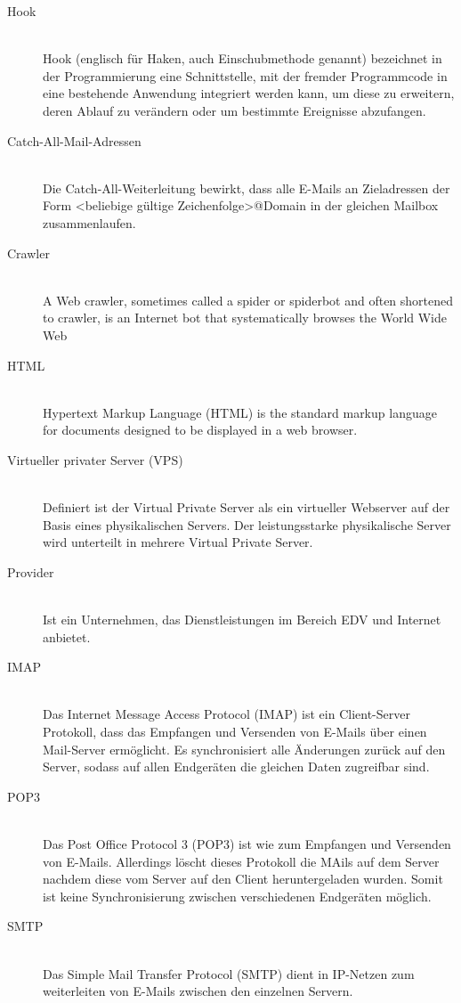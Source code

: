 \documentclass[a4paper,11pt,singlespacing]{article}
\begin{document}
\begin{description}
	\item[Hook\label{itm:Hook}]\hfill \\
		Hook (englisch für Haken, auch Einschubmethode genannt) bezeichnet in der Programmierung eine Schnittstelle, mit der fremder Programmcode in eine bestehende Anwendung integriert werden kann, um diese zu erweitern, deren Ablauf zu verändern oder um bestimmte Ereignisse abzufangen.\cite{Hook}
	\item[Catch-All-Mail-Adressen\label{itm:Catch-All-Mail}]\hfill \\
		Die Catch-All-Weiterleitung bewirkt, dass alle E-Mails an Zieladressen der Form <beliebige gültige Zeichenfolge>@Domain in der gleichen Mailbox zusammenlaufen.\cite{Catch-All-Mail}
	\item[Crawler\label{itm:crawler}]\hfill \\
		A Web crawler, sometimes called a spider or spiderbot and often shortened to crawler, is an Internet bot that systematically browses the World Wide Web \cite{crawler}
	\item[HTML\label{itm:HTML}]\hfill \\
		Hypertext Markup Language (HTML) is the standard markup language for documents designed to be displayed in a web browser.\cite{HTML}
	\item[Virtueller privater Server (VPS)\label{itm:VPS}]\hfill \\
        	Definiert ist der Virtual Private Server als ein virtueller Webserver auf der Basis eines physikalischen Servers.
		Der leistungsstarke physikalische Server wird unterteilt in mehrere Virtual Private Server.\cite{VPS}
	\item[Provider\label{itm:Provider}]\hfill \\
		Ist ein Unternehmen, das Dienstleistungen im Bereich EDV und Internet anbietet. \cite{provider}
	\item[IMAP\label{itm:IMAP}]\hfill \\
		Das Internet Message Access Protocol (IMAP) ist ein Client-Server Protokoll, dass das Empfangen und Versenden von E-Mails über einen Mail-Server ermöglicht. Es synchronisiert alle Änderungen zurück auf den Server, sodass auf allen Endgeräten die gleichen Daten zugreifbar sind. \cite{imap}
	\item[POP3\label{itm:POP3}]\hfill \\
		Das Post Office Protocol 3 (POP3) ist wie  zum  Empfangen und Versenden von E-Mails. Allerdings löscht dieses Protokoll die MAils auf dem Server nachdem diese vom Server auf den Client heruntergeladen wurden. Somit ist keine Synchronisierung zwischen verschiedenen Endgeräten möglich.\cite{pop3}
	\item[SMTP\label{itm:SMTP}]\hfill \\
		Das Simple Mail Transfer Protocol (SMTP) dient in IP-Netzen zum weiterleiten von E-Mails zwischen den einzelnen Servern. \cite{smtp}
	\end{description}
\end{document}
